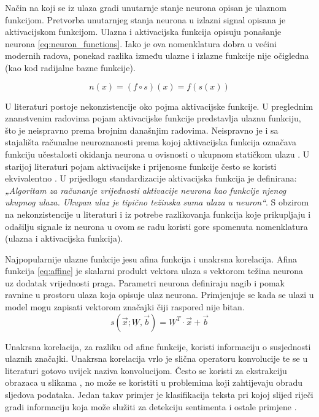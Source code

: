 \documentclass[times, utf8, numeric, diplomski]{fer}
\def\mat#1{\underline{#1}}
\begin{document}
Način na koji se iz ulaza gradi unutarnje stanje neurona opisan je ulaznom funkcijom. Pretvorba unutarnjeg stanja neurona u izlazni signal opisana je aktivacijskom funkcijom. Ulazna i aktivacijska funkcija opisuju ponašanje neurona \eqref{eq:neuron_functions}. Iako je ova nomenklatura dobra u većini modernih radova, ponekad razlika između ulazne i izlazne funkcije nije očigledna (kao kod radijalne bazne funkcije).

\begin{equation}
\label{eq:neuron_functions}
n(x) = (f \circ s)(x) = f(s(x))
\end{equation}

U literaturi postoje nekonzistencije oko pojma aktivacijske funkcije. U preglednim znanstvenim radovima \citep{function_survey1, function_survey2, function_survey3} pojam aktivacijske funkcije predstavlja ulaznu funkciju, što je neispravno prema brojnim današnjim radovima. Neispravno je i sa stajališta računalne neuroznanosti prema kojoj aktivacijska funkcija označava funkciju učestalosti okidanja neurona u ovisnosti o ukupnom statičkom ulazu \citep[str.~234]{neuroscience}. U starijoj literaturi pojam aktivacijske i prijenosne funkcije često se koristi ekvivalentno \citep{evolving_transfer, evo_parsimonious}. U prijedlogu standardizacije \citet{ieee_standardization} aktivacijska funkcija je definirana: \textit{„Algoritam za računanje vrijednosti aktivacije neurona kao funkcije njenog ukupnog ulaza. Ukupan ulaz je tipično težinska suma ulaza u neuron“}. S obzirom na nekonzistencije u literaturi i iz potrebe razlikovanja funkcija koje prikupljaju i odašilju signale iz neurona u ovom se radu koristi gore spomenuta nomenklatura (ulazna i aktivacijska funkcija).

Najpopularnije ulazne funkcije jesu afina funkcija i unakrsna korelacija.
Afina funkcija \eqref{eq:affine} je skalarni produkt vektora ulaza s vektorom težina neurona uz dodatak vrijednosti praga. Parametri neurona definiraju nagib i pomak ravnine u prostoru ulaza koja opisuje ulaz neurona. Primjenjuje se kada se ulazi u model mogu zapisati vektorom značajki čiji raspored nije bitan.
\begin{equation}
\label{eq:affine}
s(\vec{x};\mat{W},\vec{b})=\mat{W}^T \cdot \vec{x} + \vec{b}
\end{equation}

Unakrsna korelacija, za razliku od afine funkcije, koristi informaciju o susjednosti ulaznih značajki. Unakrsna korelacija vrlo je slična operatoru konvolucije te se u literaturi gotovo uvijek naziva konvolucijom. Često se koristi za ekstrakciju obrazaca u slikama \citep{alexnet}, no može se koristiti u problemima koji zahtijevaju obradu sljedova podataka. Jedan takav primjer je klasifikacija teksta pri kojoj slijed riječi gradi informaciju koja može služiti za detekciju sentimenta i ostale primjene \citep{char_cnn}.
\end{document}
